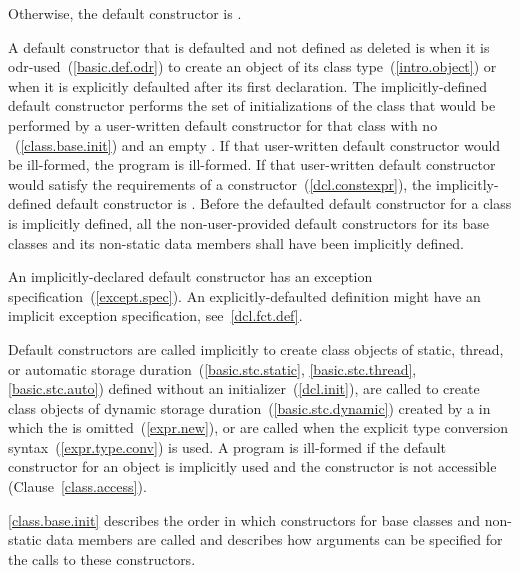 Otherwise, the default constructor is
.

\pnum
{}%
A default constructor
that is defaulted and not defined as deleted
is
when it is odr-used~(\ref{basic.def.odr})
to create an object of its class type~(\ref{intro.object})
or when it is explicitly defaulted after its first declaration.
The implicitly-defined default constructor performs the set of
initializations of the class that would be performed by a user-written default
constructor for that class with no
~(\ref{class.base.init}) and an empty
.
If that user-written default constructor would be ill-formed,
the program is ill-formed.
If that user-written default constructor would satisfy the requirements
of a  constructor~(\ref{dcl.constexpr}), the implicitly-defined
default constructor is .
Before the defaulted default constructor for a class is
implicitly defined,
all the non-user-provided default constructors for its base classes and
its non-static data members shall have been implicitly defined.
\begin{note}
An implicitly-declared default constructor has an
exception specification~(\ref{except.spec}).
An explicitly-defaulted definition might have an
implicit exception specification, see~\ref{dcl.fct.def}.
\end{note}

\pnum
{}%
Default constructors are called implicitly to create class objects of static, thread,
or automatic storage duration~(\ref{basic.stc.static}, \ref{basic.stc.thread}, \ref{basic.stc.auto}) defined
without an initializer~(\ref{dcl.init}),
are called to create class objects of dynamic storage duration~(\ref{basic.stc.dynamic}) created by a
in which the
is omitted~(\ref{expr.new}), or
are called when the explicit type conversion syntax~(\ref{expr.type.conv}) is
used.
A program is ill-formed if the default constructor for an object
is implicitly used and the constructor is not accessible (Clause~\ref{class.access}).

\pnum
\begin{note}
%
%
\ref{class.base.init} describes the order in which constructors for base
classes and non-static data members are called and
describes how arguments can be specified for the calls to these constructors.
\end{note}

